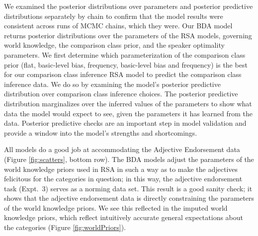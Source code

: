\documentclass[doc]{apa6}
\begin{document}
We examined the posterior distributions over parameters and posterior predictive distributions separately by chain to confirm that the model results were consistent across runs of MCMC chains, which they were. 
Our BDA model returns posterior distributions over the parameters of the RSA models, governing world knowledge, the comparison class prior, and the speaker optimality parameters. We first determine which parameterization of the comparison class prior (flat, basic-level bias, frequency, basic-level bias and frequency) is the best for our comparison class inference RSA model to predict the comparison class inference data. 
We do so by examining the model's posterior predictive distribution over comparison class inference choices.
The posterior predictive distribution marginalizes over the inferred values of the parameters to show what data the model would expect to see, given the parameters it has learned from the data. 
Posterior predictive checks are an important step in model validation and provide a window into the model's strengths and shortcomings. 




All models do a good job at accommodating the Adjective Endorsement data (Figure \ref{fig:scatters}, bottom row).
The BDA models adjust the parameters of the world knowledge priors used in RSA in such a way as to make the adjectives felicitous for the categories in question; in this way, the adjective endorsement task (Expt.~3) serves as a norming data set. 
This result is a good sanity check; it shows that the adjective endorsement data is directly constraining the parameters of the world knowledge priors. 
We see this reflected in the imputed world knowledge priors, which reflect intuitively accurate general expectations about the categories (Figure \ref{fig:worldPriors}). 

\end{document}
